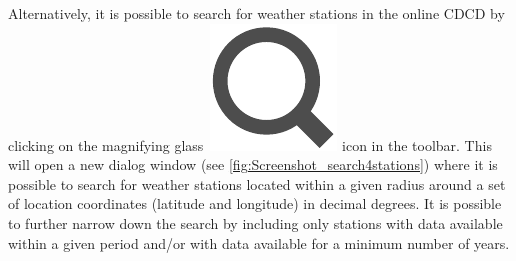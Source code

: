 \documentclass[WHATMANUAL.tex]{subfiles}
\begin{document}
Alternatively, it is possible to search for weather stations in the online CDCD by clicking on the magnifying glass~{\includegraphics[height=2ex]{img/search}} icon in the toolbar. This will open a new dialog window (see \cref{fig:Screenshot_search4stations}) where it is possible to search for weather stations located within a given radius around a set of location coordinates (latitude and longitude) in decimal degrees. It is possible to further narrow down the search by including only stations with data available within a given period and/or with data available for a minimum number of years.

\begin{figure}[!hb]
    \setlength{\fboxsep}{0pt}
    {
    }
    
    \vspace{2em}
    
    {
    }
\end{figure}
\end{document}
